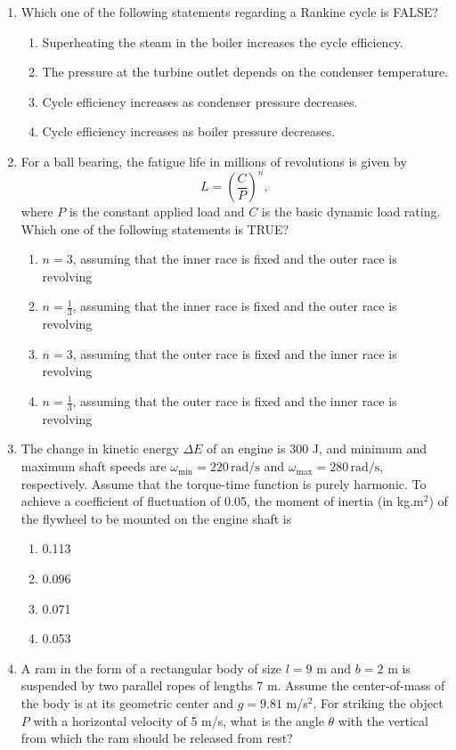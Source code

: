 \documentclass[journal,12pt,onecolumn]{IEEEtran}
\theoremstyle{remark}
\begin{document}
\begin{enumerate}
\item Which one of the following statements regarding a Rankine cycle is FALSE?
\begin{enumerate}
	\item Superheating the steam in the boiler increases the cycle efficiency.
	\item The pressure at the turbine outlet depends on the condenser temperature.
	\item Cycle efficiency increases as condenser pressure decreases.
	\item Cycle efficiency increases as boiler pressure decreases.
\end{enumerate}

\item For a ball bearing, the fatigue life in millions of revolutions is given by 
\[
L = \left(\frac{C}{P}\right)^n,
\]
where $P$ is the constant applied load and $C$ is the basic dynamic load rating. Which one of the following statements is TRUE?
\begin{enumerate}
	\item $n = 3$, assuming that the inner race is fixed and the outer race is revolving
	\item $n = \frac{1}{3}$, assuming that the inner race is fixed and the outer race is revolving
	\item $n = 3$, assuming that the outer race is fixed and the inner race is revolving
	\item $n = \frac{1}{3}$, assuming that the outer race is fixed and the inner race is revolving
\end{enumerate}

\item The change in kinetic energy $\Delta E$ of an engine is 300 J, and minimum and maximum shaft speeds are $\omega_{\min} = 220 \, \text{rad/s}$ and $\omega_{\max} = 280 \, \text{rad/s}$, respectively. Assume that the torque-time function is purely harmonic. To achieve a coefficient of fluctuation of 0.05, the moment of inertia (in kg.m$^2$) of the flywheel to be mounted on the engine shaft is
\begin{enumerate}
	\item 0.113
	\item 0.096
	\item 0.071
	\item 0.053
\end{enumerate}

\item A ram in the form of a rectangular body of size $l = 9$ m and $b = 2$ m is suspended by two parallel ropes of lengths 7 m. Assume the center-of-mass of the body is at its geometric center and $g = 9.81$ m/s$^2$. For striking the object $P$ with a horizontal velocity of 5 m/s, what is the angle $\theta$ with the vertical from which the ram should be released from rest?


\end{enumerate}
\end{document}
